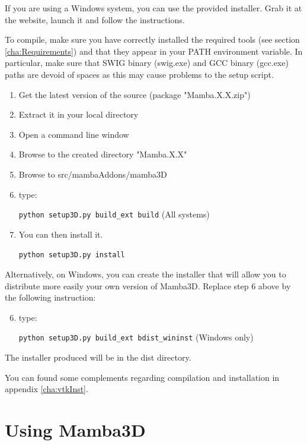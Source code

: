 \documentclass[a4paper,10pt,oneside]{article}
\begin{document}
If you are using a Windows system, you can use the provided installer. Grab it
at the website, launch it and follow the instructions.

To compile, make sure you have correctly installed the required tools (see section
\ref{cha:Requirements}) and that they appear in your PATH environment variable.
In particular, make sure that SWIG binary (swig.exe) and GCC binary (gcc.exe)
paths are devoid of spaces as this may cause problems to the setup script.

\begin{enumerate}
\item Get the latest version of the source (package "Mamba.X.X.zip")
\item Extract it in your local directory
\item Open a command line window
\item Browse to the created directory "Mamba.X.X"
\item Browse to src/mambaAddons/mamba3D
\item type:

\texttt{python setup3D.py build\_ext build} (All systems)

\item You can then install it.

\texttt{python setup3D.py install}

\end{enumerate}

Alternatively, on Windows, you can create the installer that will allow you to 
distribute more easily your own version of Mamba3D. Replace step 6 above by the 
following instruction:

\begin{enumerate}
\setcounter{enumi}{5}
\item type:

\texttt{python setup3D.py build\_ext bdist\_wininst} (Windows only)

\end{enumerate}

The installer produced will be in the dist directory.

You can found some complements regarding compilation and installation in
appendix \ref{cha:vtkInst}.

\pagebreak

\section{Using Mamba3D}
\label{cha:Use3D}
\end{document}
